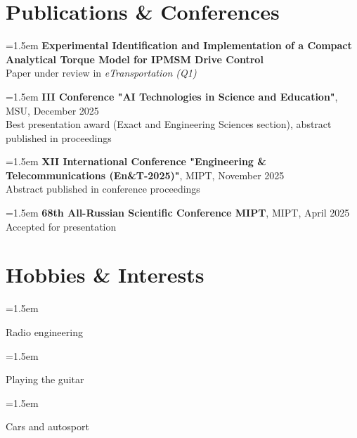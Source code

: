 \documentclass[12pt]{article}
\newcommand{\mainColor}{Blue} %
\newcommand{\shspace}{\hspace*{0.5em}}
\newcommand{\negshspace}{\hspace*{-0.5em}}
\newcommand{\neghvspace}{\vspace*{-1.5em}}
\newcommand{\svspace}{\vspace*{0.5em}}
\newcommand{\boxAwesome}[1]{
   \makebox[1.50em][c]{
      #1
   }
}
\newcommand{\cvsection}[2]{
    \section*{
        \color{\mainColor} \boxAwesome{#1} \negshspace #2
    }
}
\newcommand{\simpleSkill}[1]{
    \noindent\hangindent=1.5em\hangafter=0
    \faAngleRight
    \shspace
    #1
    \svspace
    \par
}
\newcommand{\hobby}[2]{
    \noindent\hangindent=1.5em\hangafter=0
    \faAngleRight
    \shspace
    \boxAwesome{#1} #2
    \svspace
    \par
}
\begin{document}
\cvsection{\faBookOpen}{Publications \& Conferences}
\svspace

\simpleSkill{\textbf{Experimental Identification and Implementation of a Compact Analytical Torque Model for IPMSM Drive Control} \\
Paper under review in \textit{eTransportation (Q1)}}

\simpleSkill{\textbf{III Conference "AI Technologies in Science and Education"}, MSU, December 2025 \\
Best presentation award (Exact and Engineering Sciences section), abstract published in proceedings}

\simpleSkill{\textbf{XII International Conference "Engineering \& Telecommunications (En\&T-2025)"}, MIPT, November 2025 \\
Abstract published in conference proceedings}

\simpleSkill{\textbf{68th All-Russian Scientific Conference MIPT}, MIPT, April 2025 \\
Accepted for presentation}


    \neghvspace
    \cvsection{\faPuzzlePiece}{Hobbies \& Interests}
    \svspace

    \hobby{\faTv}{Radio engineering}
    \hobby{\faGuitar}{Playing the guitar}
    \hobby{\faCar}{Cars and autosport}
\end{document}
